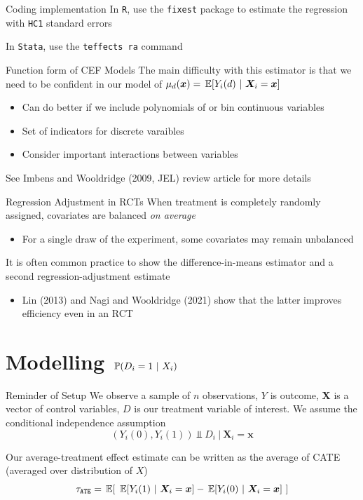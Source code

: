 \documentclass[aspectratio=169,t,11pt,table]{beamer}
\begin{document}
\begin{frame}{Coding implementation}
  In \texttt{R}, use the \texttt{fixest} package to estimate the regression with \texttt{HC1} standard errors

  \bigskip
  In \texttt{Stata}, use the \texttt{teffects ra} command
\end{frame}

\begin{frame}{Function form of CEF Models}
  The main difficulty with this estimator is that we need to be confident in our model of $\mu_d(\bm{x}) = \expec{Y_i(d)}{\bm{X}_i = \bm{x}}$
  \begin{itemize}
    \item Can do better if we include polynomials of or bin continuous variables 
    \item Set of indicators for discrete varaibles
    \item Consider important interactions between variables
  \end{itemize}

  \bigskip
  See Imbens and Wooldridge (2009, JEL) review article for more details
\end{frame}

\begin{frame}{Regression Adjustment in RCTs}
  When treatment is completely randomly assigned, covariates are balanced \emph{on average}
  \begin{itemize}
    \item For a single draw of the experiment, some covariates may remain unbalanced
  \end{itemize}

  \pause
  \bigskip
  It is often common practice to show the difference-in-means estimator and a second regression-adjustment estimate
  \begin{itemize}
    \item Lin (2013) and Nagi and Wooldridge (2021) show that the latter improves efficiency even in an RCT
  \end{itemize}
\end{frame}


\section{Modelling $\prob{D_i = 1}{X_i}$}

\begin{frame}{Reminder of Setup}
  We observe a sample of $n$ observations, $Y$ is outcome, $\bm{X}$ is a vector of control variables, $D$ is our treatment variable of interest. We assume the conditional independence assumption
  $$
    (Y_{i}(0), Y_{i}(1)) \Perp D_i \ \vert \ \bm{X}_i = \bm{x}
  $$

  \pause
  \bigskip
  Our average-treatment effect estimate can be written as the average of CATE (averaged over distribution of $X$)
  $$
    \tau_{\texttt{ATE}} = \expec{\ \expec{Y_i(1)}{\bm{X}_i = \bm{x}} - \expec{Y_i(0)}{\bm{X}_i = \bm{x}} \ }
  $$
\end{frame}
\end{document}
